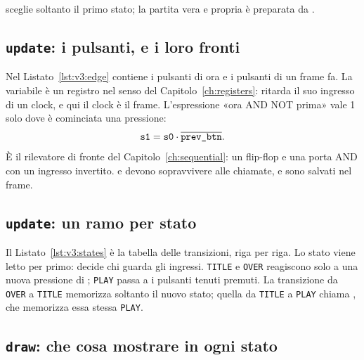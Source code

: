 
 sceglie soltanto il primo stato; la partita vera e propria è
preparata da .

\subsection{\texttt{update}: i pulsanti, e i loro fronti}


Nel Listato~\ref{lst:v3:edge}  contiene i pulsanti di ora e
 i pulsanti di un frame fa. La variabile  è un
registro nel senso del Capitolo~\ref{ch:registers}: ritarda il suo ingresso di
un clock, e qui il clock è il frame. L'espressione «ora AND NOT prima» vale 1
solo dove è cominciata una pressione:
\[ \texttt{s1}=\texttt{s0}\cdot\overline{\texttt{prev\_btn}} . \]
È il rilevatore di fronte del Capitolo~\ref{ch:sequential}: un flip-flop e una
porta AND con un ingresso invertito.  e  devono sopravvivere
alle chiamate, e sono salvati nel frame.

\subsection{\texttt{update}: un ramo per stato}


Il Listato~\ref{lst:v3:states} è la tabella delle transizioni, riga per riga.
Lo stato viene letto per primo: decide chi guarda gli ingressi. \texttt{TITLE}
e \texttt{OVER} reagiscono solo a una nuova pressione di ; \texttt{PLAY}
passa a  i pulsanti tenuti premuti. La transizione da
\texttt{OVER} a \texttt{TITLE} memorizza soltanto il nuovo stato; quella da
\texttt{TITLE} a \texttt{PLAY} chiama , che memorizza essa
stessa \texttt{PLAY}.

\subsection{\texttt{draw}: che cosa mostrare in ogni stato}


